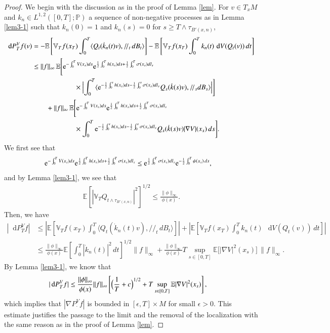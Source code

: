 \documentclass[11pt,twoside, reqno]{article}
\newcommand{\ed}{\mathop{}\!\mathrm{d}}
\def\r{\right}
\def\l{\left}
\def\ptr {/\!/}
\def\e{{\rm e}}
\newcommand\1{\mathbbm{1}}
\newcommand\E{\mathbb{E}}
\theoremstyle{definition}
\numberwithin{equation}{section}
\def \e{{\rm e}}
\begin{document}
\begin{proof}
We begin with the discussion as in the proof of Lemma \ref{lem}. For $v\in T_xM$ and 
$k_n\in L^{1,2}([0,T]; \mathbb{P})$ a sequence of non-negative processes as in Lemma  \ref{lem3-1} such that $k_n(0)=1$ and
$k_n(s)=0$ for $s\geq T\wedge \tau_{B'(x,n)}$,
\begin{align}\label{Bismut-F}
    \ed P_T^V f(v)&= -\E\l[ \mathbb{V}_{T} f(x_{T})\int_0^{T} \langle Q_t(\dot{k}_n(t)v), /\!/ _t \,dB_t\rangle\r]
    -\E\l[\mathbb{V}_T f(x_T)\int_0^{T} k_n(t) \, \ed V (Q_t(v))\,dt \r] \notag\\
&\leq  \|f\|_{\infty} \,
\mathbb{E} \Biggl[ \e^{-\int_0^T V(x_s) ds} \e^{\frac{1}{2}\int_0^T h(x_s) ds + \frac{1}{2}\int_0^T \sigma(x_s) d l_s} \notag \\
&\qquad\qquad \qquad \times \Bigl| \int_0^T 
\langle \e^{-\frac12\int_0^s h(x_s) ds - \frac12\int_0^s \sigma(x_s) d l_s} Q_s (\dot{k}(s) v), \ptr_s dB_s \rangle \Bigr| \Biggr] \notag \\
& \qquad + \|f\|_{\infty} \,
\mathbb{E} \Biggl[ \e^{-\int_0^T V(x_s) ds} \e^{\frac{1}{2}\int_0^T h(x_s) ds + \frac{1}{2}\int_0^T \sigma(x_s) d l_s} \notag \\
&\qquad\qquad \qquad \times  \int_0^T 
\e^{-\frac12\int_0^s h(x_s) ds - \frac12\int_0^s \sigma(x_s) d l_s} Q_s (\dot{k}(s) v) |\nabla V|(x_s)\, ds  \Biggr]. 
\end{align} 
We first see that  
\begin{align*}
\e^{-\int_0^T V(x_s) ds} \e^{\frac{1}{2}\int_0^T h(x_s) ds + \frac{1}{2}\int_0^T \sigma(x_s) d l_s} 
&\leq \e^{\frac{1}{2}\int_0^{T} \sigma (x_s) d l_s} \e^{-\frac{1}{2}\int_0^T\psi(x_s)\,d s},
\end{align*}
and by Lemma \ref{lem3-1}, we see that
\begin{align*}
\E[|\mathbb{V}_T Q_{t\wedge \tau_{B'(x,n)}}|^2]^{1/2}\leq \frac{\|\phi\|_{\infty}}{\phi(x)}. 
\end{align*}
Then, we have
\begin{align*}
    |\ed P_T^V f|&\leq \l|\E\l[ \mathbb{V}_T f(x_T)\int_0^{T} \langle Q_t(\dot{k}_n(t)v), /\!/ _t \,dB_t\rangle\r]\r|+
 \l|\E\l[\mathbb{V}_T f(x_T)\int_0^{T} k_n(t) \, \ed V (Q_t(v))\, dt \r]\r|\\
   &\leq \frac{\|\phi\|_{\infty}}{\phi(x)}  \E\l[\int_0^{T}|\dot{k}_n(t)|^2 \,d t\r]^{1/2}\|f\|_{\infty}+\frac{\|\phi\|_{\infty}}{\phi(x)}T \sup_{s\in [0,T]}\E\Big[ |\nabla V|^2(x_s)\Big] \, \|f\|_{\infty}.
\end{align*} 
By Lemma \ref{lem3-1}, we know that 
\begin{align*}
    |\ed P_T^V f|&\leq  \frac{\|\phi\|_{\infty}}{\phi(x)} \|f\|_{\infty} \l[\Bigl(\frac{1}{T}+c\Bigr)^{1/2}+ T \sup_{s\in [0,T]}\E |\nabla V|^2(x_s)\r],
    \end{align*}
    which implies that
    $|\nabla P_{\cdot}^Vf|$ is bounded in $[\epsilon, T]\times M$ for small $\epsilon>0$.
    This estimate justifies the
passage to the limit and the removal of the localization with the same reason as in the proof of Lemma \ref{lem}.
     
\end{proof}
\end{document}
